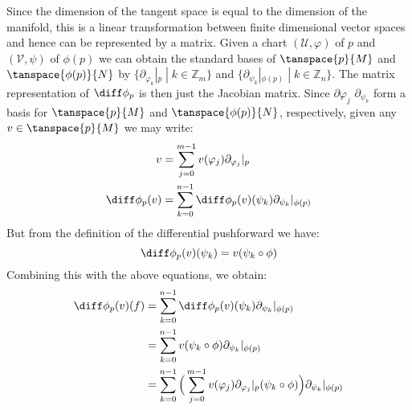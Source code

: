 \documentclass{book}                                                           %
\begin{document}
                Since the dimension of the tangent space is equal to the
                dimension of the manifold, this is a linear transformation
                between finite dimensional vector spaces and hence can be
                represented by a matrix. Given a chart
                $(\mathcal{U},\varphi)$ of $p$ and $(\mathcal{V},\psi)$ of
                $\phi(p)$ we can obtain the standard bases of $\tanspace{p}{M}$
                and $\tanspace{\phi(p)}{N}$ by
                $\{\partial_{\varphi_{k}}|_{p}\;|\;k\in\mathbb{Z}_{m}\}$ and
                $\{\partial_{\psi_{k}}|_{\phi(p)}\;|\;k\in\mathbb{Z}_{n}\}$. The
                matrix representation of $\diff\phi_{p}$ is then just the
                Jacobian matrix. Since
                $\partial\varphi_{j}$ $\partial_{\psi_{k}}$ form a basis
                for $\tanspace{p}{M}$ and $\tanspace{\phi(p)}{N}$, respectively,
                given any $v\in\tanspace{p}{M}$ we may write:
                \begin{subequations}
                    \begin{align}
                        v&=\sum_{j=0}^{m-1}v(\varphi_{j})
                            \partial_{\varphi_{j}}|_{p}\\
                        \diff\phi_{p}(v)&=\sum_{k=0}^{n-1}
                            \diff\phi_{p}(v)(\psi_{k})
                            \partial_{\psi_{k}}|_{\phi(p)}
                    \end{align}
                \end{subequations}
                But from the definition of the differential pushforward we have:
                \begin{equation}
                    \diff\phi_{p}(v)(\psi_{k})=v(\psi_{k}\circ\phi)
                \end{equation}
                Combining this with the above equations, we obtain:
                \begin{subequations}
                    \begin{align}
                        \diff\phi_{p}(v)(f)&=\sum_{k=0}^{n-1}
                            \diff\phi_{p}(v)(\psi_{k})
                            \partial_{\psi_{k}}|_{\phi(p)}\\
                        &=\sum_{k=0}^{n-1}v(\psi_{k}\circ\phi)
                            \partial_{\psi_{k}}|_{\phi(p)}\\
                        &=\sum_{k=0}^{n-1}\Big(
                            \sum_{j=0}^{m-1}v(\varphi_{j})
                            \partial_{\varphi_{j}}|_{p}(\psi_{k}\circ\phi)
                        \Big)\partial_{\psi_{k}}|_{\phi(p)}
                    \end{align}
                \end{subequations}
\end{document}
